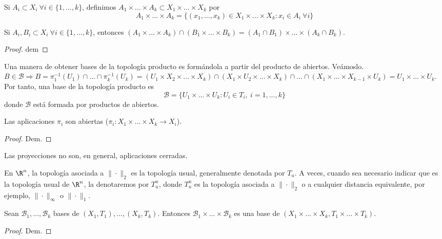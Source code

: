 \begin{ndef}
  Si $A_i \subset X_i \ \forall i \in \{1, \dots, k\}$, definimos $A_1 \times \dots \times A_k \subset X_1 \times \dots \times X_k$ por
  \[A_1 \times \dots \times A_k = \{(x_1,\dots,x_k) \in X_1 \times \dots \times X_k : x_i \in A_i \ \forall i\}\]
\end{ndef}
\begin{properties}
    Si $A_i,B_i \subset X_i \ \forall i \in \{1,\dots,k\}$, entonces $(A_1 \times \dots \times A_k) \cap (B_1 \times \dots \times B_k) = (A_1 \cap B_1) \times \dots \times (A_k \cap B_k)$.
\end{properties}
\begin{proof}
    dem
\end{proof}
Una manera de obtener bases de la topología producto es formándola a partir del producto de abiertos. Veámoslo. 
$B \in \mathcal{B} \Rightarrow B = \pi^{-1}_1(U_1) \cap \dots\cap \pi^{-1}_k(U_k) = (U_1 \times X_2 \times \dots \times X_k) \cap (X_1 \times U_2 \times \dots \times X_k) \cap \dots \cap (X_1 \times \dots \times X_{k-1} \times U_k) = U_1 \times \dots \times U_k$. Por tanto, una base de la topología producto es
\[\mathcal{B} = \{U_1 \times \dots \times U_k : U_i \in T_i,\ i = 1,\dots,k\}\]
donde $\mathcal{B}$ está formada por productos de abiertos.
\begin{properties}
    Las aplicaciones $\pi_i$ son abiertas ($\pi_i: X_1 \times \dots \times X_k \to X_i$).
\end{properties}
\begin{proof}
    Dem.
\end{proof}
\begin{exmp}
    Las proyecciones no son, en general, aplicaciones cerradas.
\end{exmp}

\begin{exmp}
    En $\R^n$, la topología asociada a $\|\cdot\|_2$ es la topología usual, generalmente denotada por $T_u$. A veces, cuando sea necesario indicar que es la topología usual de $\R^n$, la denotaremos por $T^n_u$, donde $T^n_u$ es la topología asociada a $\|\cdot\|_2$ o a cualquier distancia equivalente, por ejemplo, $\|\cdot\|_{\infty}$ o $\|\cdot\|_1$.
\end{exmp}

\begin{properties}
    Sean $\mathcal{B}_1, \dots, \mathcal{B}_k$ bases de $(X_1,T_1), \dots, (X_k, T_k)$. Entonces $\mathcal{B}_1 \times \dots \times \mathcal{B}_k$ es una base de $(X_1 \times \dots \times X_k, T_1 \times \dots \times T_k)$.
\end{properties}
\begin{proof}
    Dem.
\end{proof}

